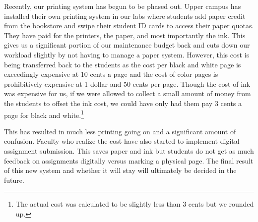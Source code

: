Recently, our printing system has begun to be phased out.  Upper campus has installed their own printing system in our labs where students add paper credit from the bookstore and swipe their student ID cards to access their paper quotas.  They have paid for the printers, the paper, and most importantly the ink.  This gives us a significant portion of our maintenance budget back and cuts down our workload slightly by not having to manage a paper system.  However, this cost is being transferred back to the students as the cost per black and white page is exceedingly expensive at 10 cents a page and the cost of color pages is prohibitively expensive at 1 dollar and 50 cents per page.  Though the cost of ink was expensive for us, if we were allowed to collect a small amount of money from the students to offset the ink cost, we could have only had them pay 3 cents a page for black and white.\footnote{The actual cost was calculated to be slightly less than 3 cents but we rounded up.}  

This has resulted in much less printing going on and a significant amount of confusion.  Faculty who realize the cost have also started to implement digital assignment submission.  This saves paper and ink but students do not get as much feedback on assignments digitally versus marking a physical page.  The final result of this new system and whether it will stay will ultimately be decided in the future.  
